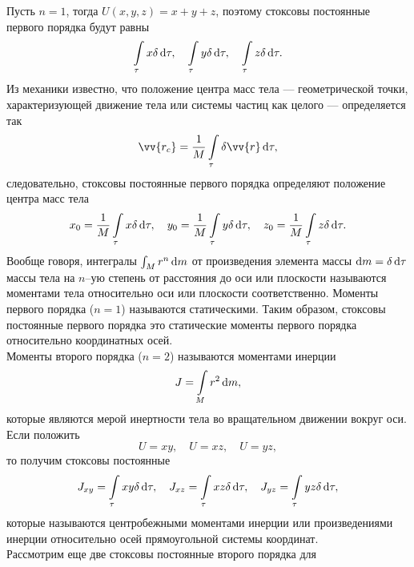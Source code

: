 \documentclass[11pt, a4paper]{article}
\theoremstyle{plain}
\theoremstyle{definition}
\theoremstyle{remark}
\begin{document}
Пусть $n = 1$,
тогда $U \left( x, y, z \right) = x + y + z$, поэтому стоксовы постоянные первого
порядка будут равны
\begin{equation*}
    \int\limits_{\tau} x \delta \dif\tau,\quad
    \int\limits_{\tau} y \delta \dif\tau,\quad 
    \int\limits_{\tau} z \delta \dif\tau.
\end{equation*}
Из механики известно, что положение центра масс тела --- геометрической точки,
характеризующей движение тела или системы частиц как целого --- определяется так
\begin{equation*}
    \vv{r_c} = \dfrac{1}{M} \int\limits_\tau \delta \vv{r}\dif\tau,
\end{equation*}
следовательно, стоксовы постоянные первого порядка определяют положение центра масс тела
\begin{equation*}
    x_0 = \dfrac{1}{M}\int\limits_{\tau} x \delta \dif\tau,\quad
    y_0 = \dfrac{1}{M}\int\limits_{\tau} y \delta \dif\tau,\quad 
    z_0 = \dfrac{1}{M}\int\limits_{\tau} z \delta \dif\tau.
\end{equation*}
Вообще говоря, интегралы $\int_M r^n \dif m$ от произведения элемента массы $\dif m = \delta\dif\tau$ массы тела на
$n$--ую степень от расстояния до оси или плоскости называются моментами тела относительно оси или
плоскости соответственно. Моменты первого порядка ($n = 1$) называются статическими. Таким образом, стоксовы
постоянные первого порядка это статические моменты первого порядка относительно координатных осей.\\
Моменты второго порядка ($n = 2$) называются моментами инерции
\begin{equation*}
    J = \int\limits_M r^2 \dif m,
\end{equation*}
которые являются мерой инертности тела во вращательном движении вокруг оси.\\
Если положить
\begin{equation*}
    U = xy,\quad U = xz, \quad U = yz,
\end{equation*}
то получим стоксовы постоянные
\begin{equation*}
    J_{xy} = \int\limits_{\tau} xy \delta \dif\tau,\quad
    J_{xz} = \int\limits_{\tau} xz \delta \dif\tau,\quad
    J_{yz} = \int\limits_{\tau} yz \delta \dif\tau,
\end{equation*}
которые называются центробежными моментами инерции или произведениями инерции относительно осей
прямоугольной системы координат.\\
Рассмотрим еще две стоксовы постоянные второго порядка для
\end{document}
